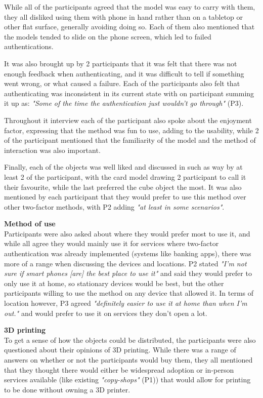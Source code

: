 \documentclass{l4proj}
\begin{document}
While all of the participants agreed that the model was easy to carry with them, they all disliked using them with phone in hand rather than on a tabletop or other flat surface, generally avoiding doing so. Each of them also mentioned that the models tended to slide on the phone screen, which led to failed authentications.

It was also brought up by 2 participants that it was felt that there was not enough feedback when authenticating, and it was difficult to tell if something went wrong, or what caused a failure. Each of the participants also felt that authenticating was inconsistent in its current state with on participant summing it up as: \textit{"Some of the time the authentication just wouldn't go through"} (P3).

Throughout it interview each of the participant also spoke about the enjoyment factor, expressing that the method was fun to use, adding to the usability, while 2 of the participant mentioned that the familiarity of the model and the method of interaction was also important.

Finally, each of the objects was well liked and discussed in such as way by at least 2 of the participant, with the card model drawing 2 participant to call it their favourite, while the last preferred the cube object the most. It was also mentioned by each participant that they would prefer to use this method over other two-factor methods, with P2 adding \textit{"at least in some scenarios"}.

\textbf{Method of use}\\
Participants were also asked about where they would prefer most to use it, and while all agree they would mainly use it for services where two-factor authentication was already implemented (systems like banking apps), there was more of a range when discussing the devices and locations. P2 stated \textit{"I'm not sure if smart phones [are] the best place to use it"} and said they would prefer to only use it at home, so stationary devices would be best, but the other participants willing to use the method on any device that allowed it. In terms of location however, P3 agreed \textit{"definitely easier to use it at home than when I'm out."} and would prefer to use it on services they don't open a lot.

\textbf{3D printing}\\
To get a sense of how the objects could be distributed, the participants were also questioned about their opinions of 3D printing. While there was a range of answers on whether or not the participants would buy them, they all mentioned that they thought there would either be widespread adoption or in-person services available (like existing \textit{"copy-shops"} (P1)) that would allow for printing to be done without owning a 3D printer.
\end{document}
